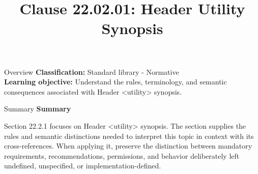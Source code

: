 \documentclass[10pt,letterpaper]{article}
\title{Clause 22.02.01: Header Utility Synopsis}
\author{}
\date{}
\begin{document}
\maketitle
\begin{CornellOverviewBox}{Overview}
\textbf{Classification:} Standard library - Normative\\[2pt]
\textbf{Learning objective:} Understand the rules, terminology, and semantic consequences associated with Header <utility> synopsis.
\end{CornellOverviewBox}\begin{CornellSummaryBox}{Summary}
{\sffamily\bfseries\color{Accent} Summary}\par\vspace{3pt}Section 22.2.1 focuses on Header <utility> synopsis. The section supplies the rules and semantic distinctions needed to interpret this topic in context with its cross-references. When applying it, preserve the distinction between mandatory requirements, recommendations, permissions, and behavior deliberately left undefined, unspecified, or implementation-defined.
\end{CornellSummaryBox}
\end{document}
